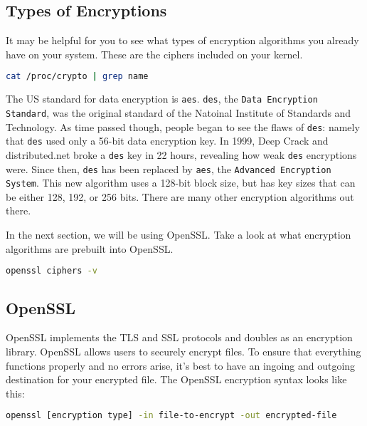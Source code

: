 \documentclass[11pt,a4paper]{article}
\begin{document}
\subsection*{Types of Encryptions}

It may be helpful for you to see what types of encryption algorithms you already have on your system. These are the ciphers included on your kernel.

\begin{lstlisting}[basicstyle=\ttfamily, backgroundcolor = \color{lightgray}, language = bash, xleftmargin = 0cm, framexleftmargin = 1em]
cat /proc/crypto | grep name
\end{lstlisting}

The US standard for data encryption is \verb|aes|. \verb|des|, the \verb|Data Encryption Standard|, was the original standard of the Natoinal Institute of Standards and Technology. As time passed though, people began to see the flaws of \verb|des|: namely that \verb|des| used only a 56-bit data encryption key. In 1999, Deep Crack and distributed.net broke a \verb|des| key in 22 hours, revealing how weak \verb|des| encryptions were. Since then, \verb|des| has been replaced by \verb|aes|, the \verb|Advanced Encryption System|. This new algorithm uses a 128-bit block size, but has key sizes that can be either 128, 192, or 256 bits. There are many other encryption algorithms out there.

In the next section, we will be using OpenSSL. Take a look at what encryption algorithms are prebuilt into OpenSSL. 

\begin{lstlisting}[basicstyle=\ttfamily, backgroundcolor = \color{lightgray}, language = bash, xleftmargin = 0cm, framexleftmargin = 1em]
openssl ciphers -v
\end{lstlisting}

\subsection*{OpenSSL}

OpenSSL implements the TLS and SSL protocols and doubles as an encryption library. OpenSSL allows users to securely encrypt files. To ensure that everything functions properly and no errors arise, it's best to have an ingoing and outgoing destination for your encrypted file. The OpenSSL encryption syntax looks like this:

\begin{lstlisting}[basicstyle=\ttfamily, backgroundcolor = \color{lightgray}, language = bash, xleftmargin = 0cm, framexleftmargin = 1em]
openssl [encryption type] -in file-to-encrypt -out encrypted-file
\end{lstlisting}
\end{document}
